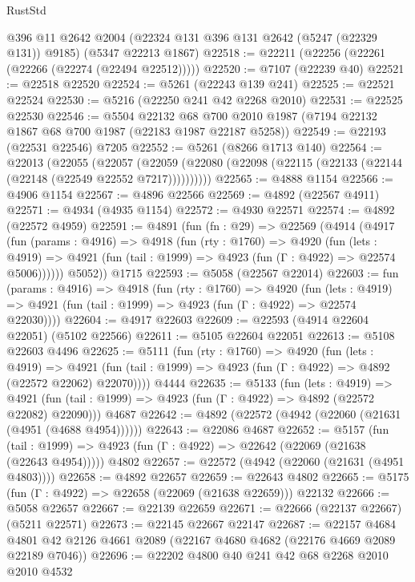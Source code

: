 \begin{lexlean}{RustStd}
\begin{coremodule}
    @396
    @11
    @2642
    @2004
    (@22324 @131 @396 @131 @2642 (@5247 (@22329 @131)) @9185)
    (@5347 @22213 @1867)
@22518 := @22211 (@22256 (@22261 (@22266 (@22274 (@22494 @22512)))))
@22520 := @7107 (@22239 @40)
@22521 := @22518 @22520
@22524 := @5261 (@22243 @139 @241)
@22525 := @22521 @22524
@22530 := @5216 (@22250 @241 @42 @2268 @2010)
@22531 := @22525 @22530
@22546 := @5504
    @22132
    @68
    @700
    @2010
    @1987
    (@7194 @22132 @1867 @68 @700 @1987 (@22183 @1987 @22187 @5258))
@22549 := @22193 (@22531 @22546) @7205
@22552 := @5261 (@8266 @1713 @140)
@22564 := @22013
    (@22055
      (@22057 (@22059 (@22080 (@22098 (@22115 (@22133 (@22144 (@22148 (@22549 @22552 @7217))))))))))
@22565 := @4888 @1154
@22566 := @4906 @1154
@22567 := @4896 @22566
@22569 := @4892 (@22567 @4911)
@22571 := @4934 (@4935 @1154)
@22572 := @4930 @22571
@22574 := @4892 (@22572 @4959)
@22591 := @4891
    (fun (fn : @29) =>
    @22569
      (@4914
        (@4917
          (fun (params : @4916) =>
          @4918
            (fun (rty : @1760) =>
            @4920
              (fun (lets : @4919) =>
              @4921 (fun (tail : @1999) => @4923 (fun (Γ : @4922) => @22574 @5006))))))
        @5052))
    @1715
@22593 := @5058 (@22567 @22014)
@22603 := fun (params : @4916) =>
  @4918
    (fun (rty : @1760) =>
    @4920
      (fun (lets : @4919) =>
      @4921 (fun (tail : @1999) => @4923 (fun (Γ : @4922) => @22574 @22030))))
@22604 := @4917 @22603
@22609 := @22593 (@4914 @22604 @22051) (@5102 @22566)
@22611 := @5105 @22604 @22051
@22613 := @5108 @22603 @4496
@22625 := @5111
    (fun (rty : @1760) =>
    @4920
      (fun (lets : @4919) =>
      @4921 (fun (tail : @1999) => @4923 (fun (Γ : @4922) => @4892 (@22572 @22062) @22070))))
    @4444
@22635 := @5133
    (fun (lets : @4919) =>
    @4921 (fun (tail : @1999) => @4923 (fun (Γ : @4922) => @4892 (@22572 @22082) @22090)))
    @4687
@22642 := @4892 (@22572 (@4942 (@22060 (@21631 (@4951 (@4688 @4954))))))
@22643 := @22086 @4687
@22652 := @5157
    (fun (tail : @1999) => @4923 (fun (Γ : @4922) => @22642 (@22069 (@21638 (@22643 @4954)))))
    @4802
@22657 := @22572 (@4942 (@22060 (@21631 (@4951 @4803))))
@22658 := @4892 @22657
@22659 := @22643 @4802
@22665 := @5175 (fun (Γ : @4922) => @22658 (@22069 (@21638 @22659))) @22132
@22666 := @5058 @22657
@22667 := @22139 @22659
@22671 := @22666 (@22137 @22667) (@5211 @22571)
@22673 := @22145 @22667 @22147
@22687 := @22157
    @4684
    @4801
    @42
    @2126
    @4661
    @2089
    (@22167 @4680 @4682 (@22176 @4669 @2089 @22189 @7046))
@22696 := @22202 @4800 @40 @241 @42 @68 @2268 @2010 @2010 @4532

\end{coremodule}
\end{lexlean}
